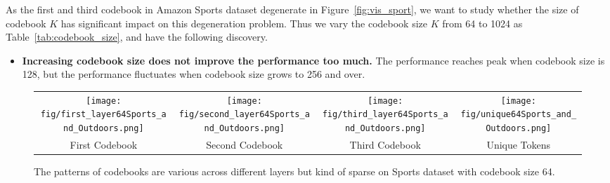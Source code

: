 As the first and third codebook in Amazon Sports dataset degenerate in Figure~\ref{fig:vis_sport}, we want to study whether the size of codebook $K$ has significant impact on this degeneration problem. Thus we vary the codebook size $K$ from 64 to 1024 as Table~\ref{tab:codebook_size}, and have the following discovery.
\begin{itemize}[leftmargin=*]
\item \textbf{Increasing codebook size does not improve the performance too much.} The performance reaches peak when codebook size is 128, but the performance fluctuates when codebook size grows to 256 and over.
\end{itemize}


\begin{figure*}[htb!]
		\centering
		\begin{tabular}{cccc}
\texttt{[image: fig/first\_layer64Sports\_and\_Outdoors.png]} &
       \texttt{[image: fig/second\_layer64Sports\_and\_Outdoors.png]}  & \texttt{[image: fig/third\_layer64Sports\_and\_Outdoors.png]}  &
       \texttt{[image: fig/unique64Sports\_and\_Outdoors.png]}
	     \\ First Codebook & Second Codebook & Third Codebook & Unique Tokens
		\end{tabular}
	\caption{The patterns of codebooks are various across different layers but kind of sparse on Sports dataset with codebook size 64.}	\label{fig:vis_sports_64}
\end{figure*} 



